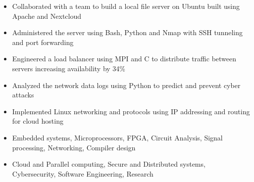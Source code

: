 \documentclass[11pt,a4paper,ragged2e]{altacv}
\begin{document}
\begin{paracol}{1}
\begin{itemize}
\item Collaborated with a team to build a local file server on Ubuntu built using Apache and Nextcloud
\item Administered the server using Bash, Python and Nmap with SSH tunneling and port forwarding
\item Engineered a load balancer using MPI and C to distribute traffic between servers increasing availability by 34\%
\item Analyzed the network data logs using Python to predict and prevent cyber attacks
\item Implemented Linux networking and protocols using IP addressing and routing for cloud hosting
\end{itemize}

\medskip

\begin{itemize} 
\item Embedded systems, Microprocessors, FPGA, Circuit Analysis, Signal processing, Networking,  Compiler design
\item Cloud and Parallel computing, Secure and Distributed systems, Cybersecurity, Software Engineering, Research
\end{itemize}





\end{paracol}
\end{document}
